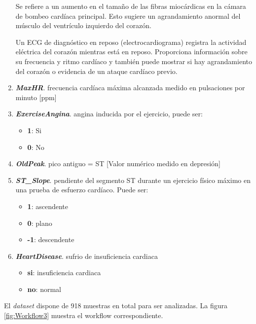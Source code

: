 \documentclass[12pt, letterpaper]{article}
\begin{document}
\begin{enumerate}
{\begin{itemize}
{        Se refiere a un aumento en el tamaño de las fibras miocárdicas en la cámara de bombeo 
        cardíaca principal.
        Esto sugiere un agrandamiento anormal del músculo del ventrículo izquierdo del corazón.
        \cite{LVH}
        }
    \end{itemize}

    Un ECG de diagnóstico en reposo (electrocardiograma) registra la actividad eléctrica 
    del corazón mientras está en reposo. Proporciona información sobre su frecuencia y 
    ritmo cardíaco y también puede mostrar si hay agrandamiento del corazón o 
    evidencia de un ataque cardíaco previo. \cite{electrocardiograma}
    } 
    \item{\textbf{\textit{MaxHR}}. frecuencia cardíaca máxima alcanzada
    medido en pulsaciones por minuto [ppm]}
    \item{\textbf{\textit{ExerciseAngina}}. angina inducida por el ejercicio, puede ser:
    \begin{itemize}
        \item{\textbf{1}}: Si
        \item{\textbf{0}}: No
    \end{itemize}
    }
    \item{\textbf{\textit{OldPeak}}. pico antiguo = ST [Valor numérico medido en depresión]}
    \item{\textbf{\textit{ST\_Slope}}. pendiente del segmento ST 
    durante un ejercicio físico máximo en una prueba de 
    esfuerzo cardíaco. Puede ser:
    \begin{itemize}
        \item{\textbf{1}}: ascendente
        \item{\textbf{0}}: plano
        \item{\textbf{-1}}: descendente
    \end{itemize}
    }
    \item{\textbf{\textit{HeartDisease}}. sufrio de insuficiencia cardiaca
    \begin{itemize}
        \item{\textbf{si}}: insuficiencia cardiaca
        \item{\textbf{no}}: normal
    \end{itemize}
    }
\end{enumerate}
El \textit{dataset} dispone de 918 muestras en total para ser analizadas.
La figura \ref{fig:Workflow3} muestra el workflow correspondiente.
\end{document}
